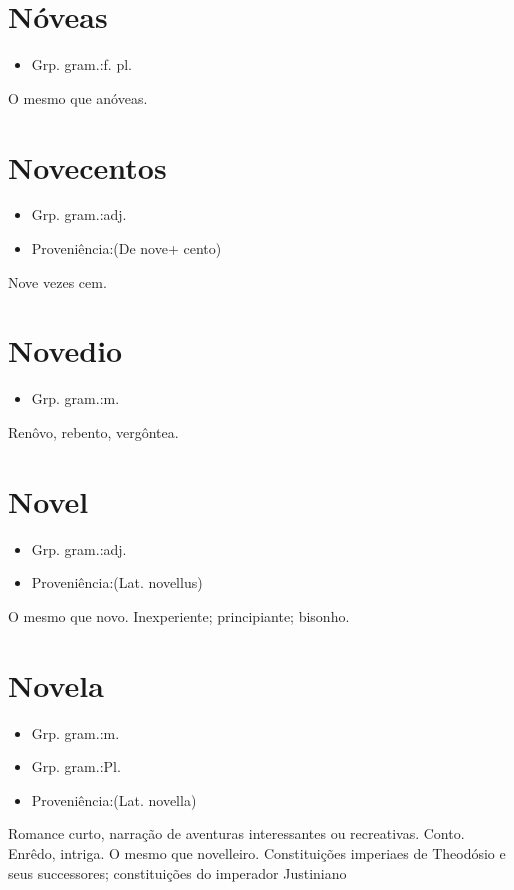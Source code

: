 \section{Nóveas}
\begin{itemize}
\item {Grp. gram.:f. pl.}
\end{itemize}
O mesmo que \textunderscore anóveas\textunderscore .
\section{Novecentos}
\begin{itemize}
\item {Grp. gram.:adj.}
\end{itemize}
\begin{itemize}
\item {Proveniência:(De \textunderscore nove\textunderscore  + \textunderscore cento\textunderscore )}
\end{itemize}
Nove vezes cem.
\section{Novedio}
\begin{itemize}
\item {Grp. gram.:m.}
\end{itemize}
Renôvo, rebento, vergôntea.
\section{Novel}
\begin{itemize}
\item {Grp. gram.:adj.}
\end{itemize}
\begin{itemize}
\item {Proveniência:(Lat. \textunderscore novellus\textunderscore )}
\end{itemize}
O mesmo que novo.
Inexperiente; principiante; bisonho.
\section{Novela}
\begin{itemize}
\item {Grp. gram.:m.}
\end{itemize}
\begin{itemize}
\item {Grp. gram.:Pl.}
\end{itemize}
\begin{itemize}
\item {Proveniência:(Lat. \textunderscore novella\textunderscore )}
\end{itemize}
Romance curto, narração de aventuras interessantes ou recreativas.
Conto.
Enrêdo, intriga.
O mesmo que \textunderscore novelleiro\textunderscore .
Constituições imperiaes de Theodósio e seus successores; constituições do imperador Justiniano
